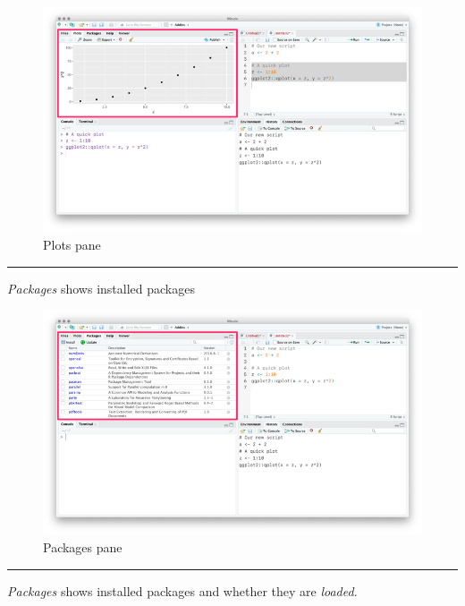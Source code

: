 \documentclass[]{book}
\begin{document}
\begin{figure}
\centering
\includegraphics{img/rstudio_plots.png}
\caption{Plots pane}
\end{figure}

\begin{center}\rule{0.5\linewidth}{\linethickness}\end{center}

\emph{Packages} shows installed packages

\begin{figure}
\centering
\includegraphics{img/rstudio_packages.png}
\caption{Packages pane}
\end{figure}

\begin{center}\rule{0.5\linewidth}{\linethickness}\end{center}

\emph{Packages} shows installed packages and whether they are \emph{loaded}.
\end{document}
